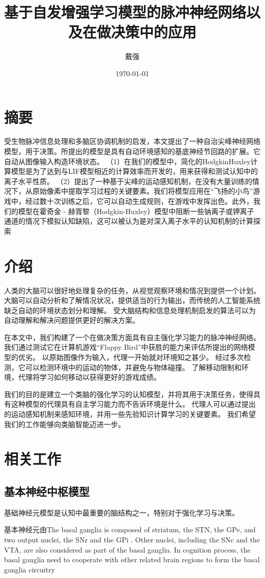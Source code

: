 \documentclass[a4paper,12pt]{ctexart}
\title{基于自发增强学习模型的脉冲神经网络以及在做决策中的应用}
\author{戴强}
\date{\today}
\begin{document}
\makeatletter
\section{摘要}
受生物脉冲信息处理和多脑区协调机制的启发，本文提出了一种自治尖峰神经网络模型，用于决策。所提出的模型是具有自动环境感知的基底神经节回路的扩展。它自动从图像输入构造环境状态。 （1）在我们的模型中，简化的HodgkinHuxley计算模型是为了达到与LIF模型相近的计算效率而开发的，用来获得和测试认知中的离子水平性质。 （2）提出了一种基于尖峰的运动感知机制，在没有大量训练的情况下，从原始像素中提取学习过程的关键要素。我们将模型应用在“飞扬的小鸟”游戏中，经过数十次训练之后，它可以自动生成规则，在游戏中发挥出色。此外，我们的模型在霍奇金 - 赫胥黎（Hodgkin-Huxley）模型中阻断一些钠离子或钾离子通道的情况下模拟认知缺陷，这可以被认为是对深入离子水平的认知机制的计算探索

\section{介绍}

人类的大脑可以很好地处理复杂的任务，从视觉观察环境和情况到提供一个计划。 大脑可以自动分析和了解情况状况，提供适当的行为输出，而传统的人工智能系统缺乏自动的环境状态划分和理解。 受大脑结构和信息处理机制启发的算法可以为自动理解和解决问题提供更好的解决方案。

在本文中，我们构建了一个在做决策方面具有自主强化学习能力的脉冲神经网络。 我们通过测试它在计算机游戏“Flappy Bird”中获胜的能力来评估所提出的网络模型的优劣。 以原始图像作为输入，代理一开始就对环境知之甚少。 经过多次检测，它可以检测环境中的运动的物体，并避免与物体碰撞。 了解移动限制和环境，代理将学习如何移动以获得更好的游戏成绩。

我们的目的是建立一个类脑的强化学习的认知模型，并将其用于决策任务，使得具有这种模型的代理具有自主学习能力而不告诉环境是什么。 代理人可以通过提出的运动感知机制来感知环境，并用一些先验知识计算学习的关键要素。 我们希望我们的工作能够向类脑智能迈进一步。

\section{相关工作}
\subsection{基本神经中枢模型}
基础神经元模型是认知中最重要的脑结构之一，特别对于强化学习与决策。

基本神经元由The basal ganglia is composed of striatum, the STN, the GPe, and two output nuclei, the SNr and the GPi . Other nuclei, including the SNc and the VTA, are also considered as part of the basal ganglia. In cognition process, the basal ganglia need to cooperate with other related brain regions to form the  basal ganglia circuitry
\end{document}
